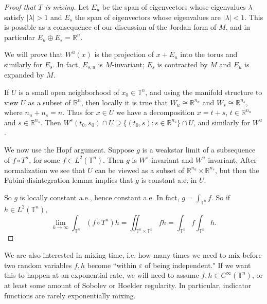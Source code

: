 \documentclass[12pt]{report}
\newcommand{\RR}{\mathbb{R}}
\newcommand{\TT}{\mathbb{T}}
\theoremstyle{definition}
\begin{document}
\begin{proof}[Proof that $T$ is mixing]
Let $E_u$ be the span of eigenvectors whose eigenvalues $\lambda$ satisfy $|\lambda| > 1$ and $E_s$ the span of eigenvectors whose eigenvalues are $|\lambda| < 1$. This is possible as a consequence of our discussion of the Jordan form of $M$, and in particular $E_u \oplus E_s = \RR^n$.

We will prove that $W^u(x)$ is the projection of $x + E_u$ into the torus and similarly for $E_s$. In fact, $E_{s,u}$ is $M$-invariant; $E_s$ is contracted by $M$ and $E_u$ is expanded by $M$.

If $U$ is a small open neighborhood of $x_0 \in \TT^n$, and using the manifold structure to view $U$ as a subset of $\RR^n$, then locally it is true that $W_u \cong \RR^{n_u}$ and $W_s \cong \RR^{n_s}$, where $n_u + n_s = n$. Thus for $x \in U$ we have a decomposition $x = t + s$, $t \in \RR^{n_u}$ and $s \in \RR^{n_s}$.
Then $W^s(t_0, s_0) \cap U \supseteq \{(t_0, s): s \in \RR^{n_s}\} \cap U$, and similarly for $W^u$.

We now use the Hopf argument. Suppose $g$ is a weakstar limit of a subsequence of $f \circ T^n$, for some $f \in L^2(\TT^n)$. Then $g$ is $W^s$-invariant and $W^u$-invariant. After normalization we see that $U$ can be viewed as a subset of $\RR^{n_u} \times \RR^{n_s}$, but then the Fubini disintegration lemma implies that $g$ is constant a.e. in $U$.

So $g$ is locally constant a.e., hence constant a.e. In fact, $g = \int_{\TT^n} f$. So if $h \in L^2(\TT^n)$,
$$\lim_{k \to \infty} \int_{\TT^n} (f \circ T^n)h = \iint_{\TT^n \times \TT^n} fh = \int_{\TT^n} f \int_{\TT^n} h.$$
\end{proof}
We are also interested in mixing time, i.e. how many times we need to mix before two random variables $f,h$ become ``within $\varepsilon$ of being independent." If we want this to happen at an exponential rate, we will need to assume $f, h\in C^\infty(\TT^n)$, or at least some amount of Sobolev or Hoelder regularity. In particular, indicator functions are rarely exponentially mixing.
\end{document}

